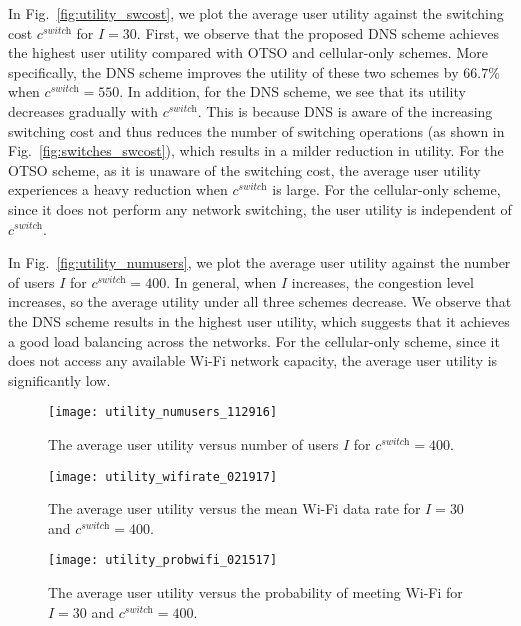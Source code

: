 \documentclass[journal]{IEEEtran}
\begin{document}
	In Fig.~\ref{fig:utility_swcost}, we plot the average user utility against the switching cost $c^{\textit{switch}}$ for $I = 30$.
	First, we observe that the proposed DNS scheme achieves the highest user utility compared with OTSO and cellular-only schemes. 
	More specifically, the DNS scheme improves the utility of these two schemes by $66.7\%$ when $c^{\textit{switch}} = 550$.
	In addition, for the DNS scheme, we see that its utility decreases gradually with $c^{\textit{switch}}$. This is because DNS is aware of the increasing switching cost and thus reduces the number of switching operations (as shown in Fig.~\ref{fig:switches_swcost}), which results in a milder reduction in utility.
	For the OTSO scheme, as it is unaware of the switching cost, the average user utility experiences a heavy reduction when $c^{\textit{switch}}$ is large.
	For the cellular-only scheme, since it does not perform any network switching, the user utility is independent of $c^{\textit{switch}}$.


	In Fig.~\ref{fig:utility_numusers}, we plot the average user utility against the number of users $I$ for $c^{\textit{switch}} = 400$. 
  In general, when $I$ increases, the congestion level increases, so the average utility under all three schemes decrease.  
  We observe that the DNS scheme results in the highest user utility, which suggests that it achieves a good load balancing across the networks.
	For the cellular-only scheme, since it does not access any available Wi-Fi network capacity, the average user utility is significantly low.
	
	
	

\begin{figure*}[t]
\hspace{-0.5cm}
\centering
%
\begin{minipage}[t]{0.3\linewidth}
       \texttt{[image: utility\_numusers\_112916]} 
   \caption{The average user utility versus number of users $I$ for $c^{\textit{switch}} = 400$.}
   \label{fig:utility_numusers}
\end{minipage}
% 
\quad
%
\begin{minipage}[t]{0.3\linewidth}
       \texttt{[image: utility\_wifirate\_021917]} 
   \caption{The average user utility versus the mean Wi-Fi data rate for $I = 30$ and $c^{\textit{switch}} = 400$.}
   \label{fig:utility_wifirate}
\end{minipage}
%
\quad
%
\begin{minipage}[t]{0.3\linewidth}
       \texttt{[image: utility\_probwifi\_021517]}
   \caption{The average user utility versus the probability of meeting Wi-Fi for $I = 30$ and $c^{\textit{switch}} = 400$.}
   \label{fig:utility_probwifi}
\end{minipage}
%
\vspace{-0.2cm}
\end{figure*}
	
\end{document}
